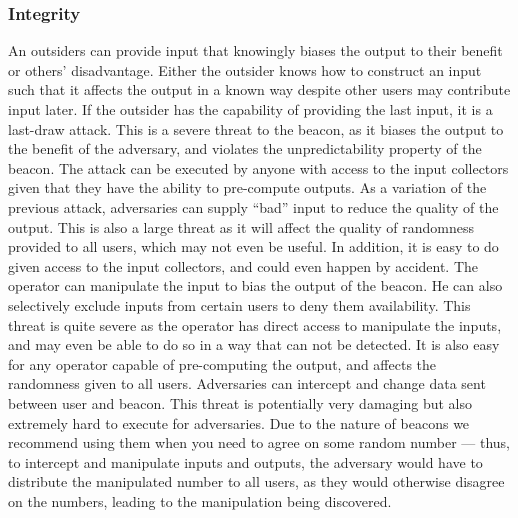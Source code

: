 \subsubsection{Integrity}

 An outsiders can provide input that knowingly biases the output to their benefit or others' disadvantage. Either the outsider knows how to construct an input such that it affects the output in a known way despite other users may contribute input later. If the outsider has the capability of providing the last input, it is a last-draw attack. This is a severe threat to the beacon, as it biases the output to the benefit of the adversary, and violates the unpredictability property  of the beacon. The attack can be executed by anyone with access to the input collectors given that they have the ability to pre-compute outputs.
 As a variation of the previous attack, adversaries can supply \enquote{bad} input to reduce the quality of the output. This is also a large threat as it will affect the quality of randomness provided to all users, which may not even be useful. In addition, it is easy to do given access to the input collectors, and could even happen by accident.
 The operator can manipulate the input to bias the output of the beacon. He can also selectively exclude inputs from certain users to deny them availability. This threat is quite severe as the operator has direct access to manipulate the inputs, and may even be able to do so in a way that can not be detected. It is also easy for any operator capable of pre-computing the output, and affects the randomness given to all users.
 Adversaries can intercept and change data sent between user and beacon. This threat is potentially very damaging but also extremely hard to execute for adversaries. Due to the nature of beacons we recommend using them when you need to agree on some random number --- thus, to intercept and manipulate inputs and outputs, the adversary would have to distribute the manipulated number to all users, as they would otherwise disagree on the numbers, leading to the manipulation being discovered.
